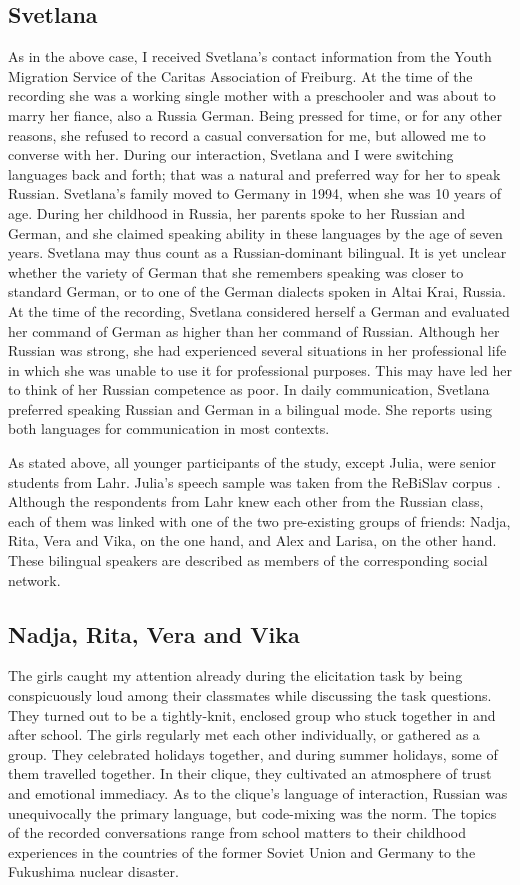 \subsection{Svetlana}
As in the above case, I received Svetlana's contact information from the Youth Migration Service of the Caritas Association of Freiburg. At the time of the recording she was a working single mother with a preschooler and was about to marry her fiance, also a Russia German. Being pressed for time, or for any other reasons, she refused to record a casual conversation for me, but allowed me to converse with her. During our interaction, Svetlana and I were switching languages back and forth; that was a natural and preferred way for her to speak Russian. Svetlana's family moved to Germany in 1994, when she was 10 years of age. During her childhood in Russia, her parents spoke to her Russian and German, and she claimed speaking ability in these languages by the age of seven years. Svetlana may thus count as a Russian-dominant bilingual. It is yet unclear whether the variety of German that she remembers speaking was closer to standard German, or to one of the German dialects spoken in Altai Krai, Russia. At the time of the recording, Svetlana considered herself a German and evaluated her command of German as higher than her command of Russian. Although her Russian was strong, she had experienced several situations in her professional life in which she was unable to use it for professional purposes. This may have led her to think of her Russian competence as poor. In daily communication, Svetlana preferred speaking Russian and German in a bilingual mode. She reports using both languages for communication in most contexts.

As stated above, all younger participants of the study, except Julia, were senior students from Lahr. Julia's speech sample was taken from the ReBiSlav corpus \citep[cf.][]{rebislav}. Although the respondents from Lahr knew each other from the Russian class, each of them was linked with one of the two pre-existing groups of friends: Nadja, Rita, Vera and Vika, on the one hand, and Alex and Larisa, on the other hand. These bilingual speakers are described as members of the corresponding social network.

\subsection{Nadja, Rita, Vera and Vika}
The girls caught my attention already during the elicitation task by being conspicuously loud among their classmates while discussing the task questions. They turned out to be a tightly-knit, enclosed group who stuck together in and after school. The girls regularly met each other individually, or gathered as a group. They celebrated holidays together, and during summer holidays, some of them travelled together. In their clique, they  cultivated an atmosphere of trust and emotional immediacy. As to the clique's language of interaction, Russian was unequivocally the primary language, but code-mixing was the norm. The topics of the recorded conversations range from school matters to their childhood experiences in the countries of the former Soviet Union and Germany to the Fukushima nuclear disaster. 

